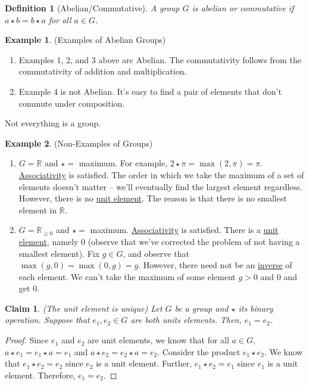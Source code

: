 \documentclass[12pt]{article}
\newtheorem{claim}{Claim}
\newtheorem{definition}{Definition}
\theoremstyle{definition}
\newtheorem{example}{Example}
\theoremstyle{definition}
\begin{document}
\begin{definition}[Abelian/Commutative]
A group $G$ is abelian or commutative if $a \star b = b \star a$ for all $a \in G$.
\end{definition}

\begin{example}(Examples of Abelian Groups)
\begin{enumerate}
\item Examples 1, 2, and 3 above are Abelian. The commutativity follows from the commutativity of addition and multiplication.
\item Example 4 is not Abelian. It's easy to find a pair of elements that don't commute under composition.
\end{enumerate}
\end{example}

Not everything is a group.
\begin{example}(Non-Examples of Groups)
\begin{enumerate}
\item $G = \mathbb{R}$ and $\star =$ maximum. For example, $2 \star \pi = \max(2,\pi) = \pi$. \underline{Associativity} is satisfied. The order in which we take the maximum of a set of elements doesn't matter -- we'll eventually find the largest element regardless. However, there is no \underline{unit element}. The reason is that there is no smallest element in $\mathbb{R}$.  
\item $G = \mathbb{R}_{\geq 0}$ and $\star =$ maximum. \underline{Associativity} is satisfied. There is a \underline{unit element}, namely $0$ (observe that we've corrected the problem of not having a smallest element). Fix $g \in G$, and observe that $\max(g,0) = \max(0,g) = g$. However, there need not be an \underline{inverse} of each element. We can't take the maximum of some element $g > 0$ and $0$ and get $0$.
\end{enumerate}
\end{example}

\begin{claim}(The unit element is unique)
Let $G$ be a group and $\star$ its binary operation. Suppose that $e_1, e_2 \in G$ are both units elements. Then, $e_1 = e_2$.
\end{claim}
\begin{proof}
Since $e_1$ and $e_2$ are unit elements, we know that for all $a \in G$, $a \star e_1 = e_1 \star a = e_1$ and $a \star e_2 = e_2 \star a = e_2$. Consider the product $e_1 \star e_2$. We know that $e_1 \star e_2 = e_2$ since $e_2$ is a unit element. Further, $e_1 \star e_2 = e_1$ since $e_1$ is a unit element. Therefore, $e_1 = e_2$. 
\end{proof}
\end{document}
